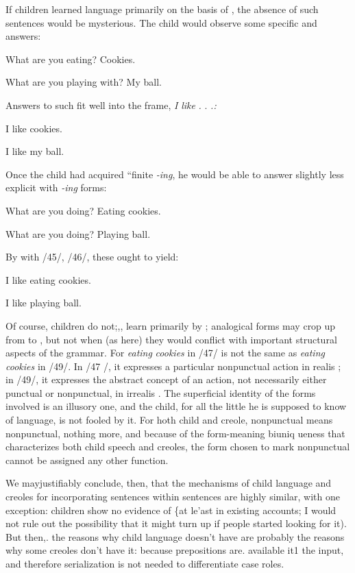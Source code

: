 If children learned language primarily on the basis of , the absence of such sentences would be mysterious. The child would observe some specific  and answers:

\ea\label{ex:43}
What are you eating? Cookies.
\glt
\z

\ea\label{ex:44}
 What are you playing with? My ball.
\glt
\z

Answers to such  fit well into the frame, \textit{I} \textit{like} \textit{.} . \textit{.}\textit{:}

\ea\label{ex:45}
 I like cookies.
\glt
\z

\ea\label{ex:46}
I like my ball.
\glt
\z

Once the child had acquired ``finite \textit{{}-ing},\textit{{\textquotedbl}} he would be able to answer slightly less explicit  with \textit{{}-ing} forms:

\ea\label{ex:47}
 What are you doing? Eating cookies.
\glt
\z

\ea\label{ex:48}
 What are you doing? Playing ball.
\glt
\z

By  with /45/, /46/, these ought to yield:

\ea\label{ex:49}
 I like eating cookies.
\glt
\z

\ea\label{ex:50}
 I like playing ball.
\glt
\z

Of course, children do not;,, learn primarily by ; analogical
forms may crop up from  to , but not when (as here) they would conflict with important structural aspects of the grammar. For \textit{eating} \textit{cookies} in /47/ is not the same as \textit{eating} \textit{cookies} in /49/. In /47 /, it expresses a particular nonpunctual action in realis ; in /49/, it expresses the abstract concept of an action, not necessarily either punctual or nonpunctual, in irrealis . The superficial identity of the forms involved is an illusory one, and the child, for all the little he is supposed to know of language, is not fooled by it. For hoth child and creole, nonpunctual means nonpunctual, nothing more, and be\-cause of the form-meaning biuniq ueness that characterizes both child speech and creoles, the form chosen to mark nonpunctual cannot be assigned any other function.

We mayjustifiably conclude, then, that the mechanisms of child
language and creoles for incorporating sentences within sentences are highly similar, with one exception: children show no evidence of  \{at le'ast in existing accounts; I would not rule out the possibility that it might turn up if people started looking for it). But then,. the reasons why child language doesn't have  are probably the reasons why some creoles don't have it: because prepositions are. available it1 the input, and therefore serialization is not needed to differentiate case roles.

